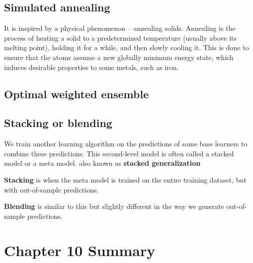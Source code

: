 \documentclass{article}
\begin{document}
\subsection{Simulated annealing}
It is inspired by a physical phenomenon – annealing solids. Annealing is the process of heating a solid to a predetermined temperature (usually above its melting point), holding it for a while, and then slowly cooling it. This is done to ensure that the atoms assume a new globally minimum energy state, which induces desirable properties to some metals, such as iron.

\subsection{Optimal weighted ensemble}

\subsection{Stacking or blending}
We train another learning algorithm on the predictions of some base learners to combine these predictions. This second-level model is often called a stacked model or a meta model.
also known as \textbf{stacked generalization}

\textbf{Stacking} is when the meta model is trained on the entire training dataset, but with out-of-sample predictions.

\textbf{Blending} is similar to this but slightly different in the way we generate out-of-sample predictions.

\section{Chapter 10 Summary}
\end{document}
